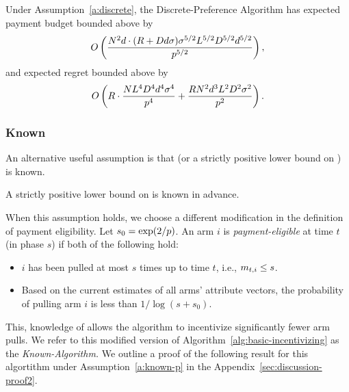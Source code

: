\begin{theorem}
\label{rst:discrete}
Under Assumption~\ref{a:discrete}, the Discrete-Preference Algorithm has expected payment budget bounded above by 
\begin{align*}
O \left(\frac{N^2 d \cdot (R + D d \sigma)\sigma^{5/2}L^{5/2}D^{5/2}d^{5/2}}{p^{5/2}} \right),
\end{align*}
and expected regret bounded above by 
\begin{align}
O \left(R\cdot \frac{N L^4 D^4 d^4 \sigma^4}{p^4}
  + \frac{R N^2 d^3 L^2 D^2 \sigma^2}{p^2}
  \right).  \nonumber
\end{align}
\end{theorem}



\subsubsection{Known \MinProb}
An alternative useful assumption is that \MinProb (or a strictly positive lower bound on \MinProb) is known.

\begin{assumption}
\label{a:known-p}
A strictly positive lower bound on \MinProb is known in advance.
\end{assumption}

When this assumption holds, we choose a different modification in the definition of payment eligibility.
Let $s_0 = \exp(2/p)$.
An arm $i$ is \emph{payment-eligible} at time $t$ (in phase $s$)
if both of the following hold:
\begin{itemize}
\item $i$ has been pulled at most
$s$ times up to time $t$, i.e., $m_{t,i} \leq s$.
\item Based on the current estimates  of all arms' attribute vectors, the probability of pulling arm $i$ is less than $1/\log(s+s_0)$.
\end{itemize}

This, knowledge of \MinProb allows the algorithm to incentivize significantly fewer arm pulls.
We refer to this modified version of Algorithm~\ref{alg:basic-incentivizing} as the \emph{Known-\MinProb Algorithm.}
We outline a proof of the following result for this algortithm under Assumption~\ref{a:known-p} in the Appendix~\ref{sec:discussion-proof2}.

